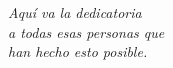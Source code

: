 \cleardoublepage
\thispagestyle{empty}

\begin{minipage}[c][\textheight][c]{\textwidth}
\raggedleft

\emph{Aquí va la dedicatoria \\
a todas esas personas que \\
han hecho esto posible.}

\end{minipage}

\blankpage